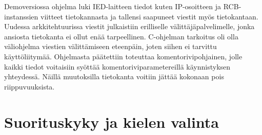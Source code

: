 Demoversiossa ohjelma luki IED-laitteen tiedot kuten IP-osoitteen ja RCB-instanssien viitteet tietokannasta ja tallensi saapuneet viestit myös tietokantaan. Uudessa arkkitehtuurissa viestit julkaistiin erilliselle välittäjäpalvelimelle, jonka ansiosta tietokanta ei ollut enää tarpeellinen. C-ohjelman tarkoitus oli olla väliohjelma viestien välittämiseen eteenpäin, joten siihen ei tarvittu käyttöliitymää. Ohjelmasta päätettiin toteuttaa komentorivipohjainen, jolle kaikki tiedot voitaisiin syöttää komentoriviparametereillä käynnistyksen yhteydessä. Näillä muutoksilla tietokanta voitiin jättää kokonaan pois riippuvuuksista.


\section{Suorituskyky ja kielen valinta}
